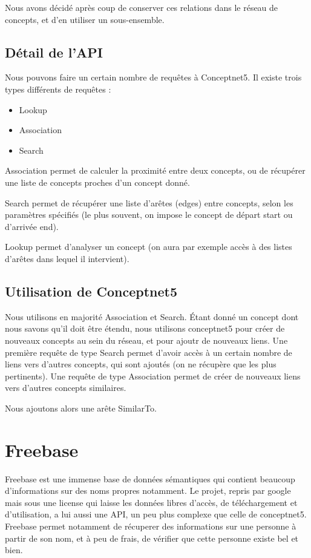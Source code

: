\documentclass[a4paper,12pt]{article}
\begin{document}
Nous avons décidé après coup de conserver ces relations dans le réseau de concepts, et d'en utiliser un sous-ensemble.

\subsection{Détail de l'API}

Nous pouvons faire un certain nombre de requêtes à Conceptnet5. Il existe trois types différents de requêtes :
\begin{itemize}
 \item Lookup
 \item Association
 \item Search
\end{itemize}
Association permet de calculer la proximité entre deux concepts, ou de récupérer une liste de concepts proches d'un concept donné.

Search permet de récupérer une liste d'arêtes (edges) entre concepts, selon les paramètres spécifiés (le plus souvent, on impose le concept de départ start ou d'arrivée end). 

Lookup permet d'analyser un concept (on aura par exemple accès à des listes d'arêtes dans lequel il intervient).


\subsection{Utilisation de Conceptnet5}

Nous utilisons en majorité Association et Search.
Étant donné un concept dont nous savons qu'il doit être étendu, nous utilisons conceptnet5 pour créer de nouveaux concepts au sein du réseau, et pour ajoutr de nouveaux liens. Une première requête de type Search permet d'avoir accès à un certain nombre de liens vers d'autres concepts, qui sont ajoutés (on ne récupère que les plus pertinents). Une requête de type Association permet de créer de nouveaux liens vers d'autres concepts similaires.

Nous ajoutons alors une arête SimilarTo.



    
\section{Freebase}

Freebase est une immense base de données sémantiques qui contient beaucoup d'informations sur des noms propres notamment. Le projet, repris par google mais sous une license qui laisse les données libres d'accès, de téléchargement et d'utilisation, a lui aussi une API, un peu plus complexe que celle de conceptnet5. Freebase permet notamment de récuperer des informations sur une personne à partir de son nom, et à peu de frais, de vérifier que cette personne existe bel et bien.

    
    
 
\end{document}
